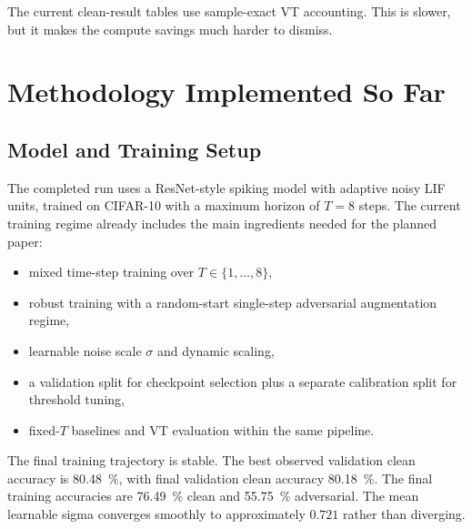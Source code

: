 \documentclass[11pt]{article}
\begin{document}
The current clean-result tables use sample-exact VT accounting. This is slower, but it makes the compute savings much harder to dismiss.

\section{Methodology Implemented So Far}
\subsection{Model and Training Setup}
The completed run uses a ResNet-style spiking model with adaptive noisy LIF units, trained on CIFAR-10 with a maximum horizon of $T=8$ steps. The current training regime already includes the main ingredients needed for the planned paper:
\begin{itemize}[leftmargin=1.5em]
    \item mixed time-step training over $T \in \{1,\dots,8\}$,
    \item robust training with a random-start single-step adversarial augmentation regime,
    \item learnable noise scale $\sigma$ and dynamic scaling,
    \item a validation split for checkpoint selection plus a separate calibration split for threshold tuning,
    \item fixed-$T$ baselines and VT evaluation within the same pipeline.
\end{itemize}

The final training trajectory is stable. The best observed validation clean accuracy is \SI{80.48}{\percent}, with final validation clean accuracy \SI{80.18}{\percent}. The final training accuracies are \SI{76.49}{\percent} clean and \SI{55.75}{\percent} adversarial. The mean learnable sigma converges smoothly to approximately $0.721$ rather than diverging.
\end{document}
